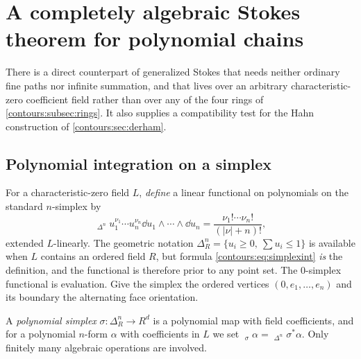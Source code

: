 \documentclass[11pt,letterpaper]{article}
\theoremstyle{definition}
\theoremstyle{remark}
\newcommand{\PInt}{\mathop{\int^{\!\mathrm{pol}}}\nolimits}
\numberwithin{equation}{section}
\begin{document}
\section{A completely algebraic Stokes theorem for polynomial chains}
\label{contours:sec:polynomial}

There is a direct counterpart of generalized Stokes that needs neither ordinary
fine paths nor infinite summation, and that lives over an arbitrary
characteristic-zero coefficient field rather than over any of the four rings of
\cref{contours:subsec:rings}. It also supplies a compatibility test for the Hahn
construction of \cref{contours:sec:derham}.

\subsection{Polynomial integration on a simplex}
For a characteristic-zero field $L$, \emph{define} a linear functional on
polynomials on the standard $n$-simplex by
\begin{equation}\label{contours:eq:simplexint}
  \PInt_{\Delta^n}u_1^{\nu_1}\cdots u_n^{\nu_n}\dd u_1\wedge\cdots\wedge \dd u_n
  =\frac{\nu_1!\cdots\nu_n!}{(|\nu|+n)!},
\end{equation}
extended $L$-linearly. The geometric notation $\Delta_R^n=\{u_i\ge0,\ \sum u_i\le1\}$
is available when $L$ contains an ordered field $R$, but formula
\eqref{contours:eq:simplexint} \emph{is} the definition, and the functional is
therefore prior to any point set. The $0$-simplex functional is evaluation. Give
the simplex the ordered vertices $(0,e_1,\ldots,e_n)$ and its boundary the
alternating face orientation.

A \emph{polynomial simplex} $\sigma:\Delta_R^n\to R^d$ is a polynomial map with
field coefficients, and for a polynomial $n$-form $\alpha$ with coefficients in $L$
we set $\PInt_\sigma\alpha=\PInt_{\Delta^n}\sigma^*\alpha$. Only finitely many
algebraic operations are involved.
\end{document}
